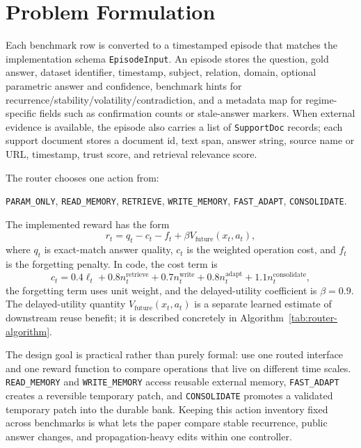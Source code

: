 \section{Problem Formulation}

Each benchmark row is converted to a timestamped episode that matches the implementation schema \texttt{EpisodeInput}. An episode stores the question, gold answer, dataset identifier, timestamp, subject, relation, domain, optional parametric answer and confidence, benchmark hints for recurrence/stability/volatility/contradiction, and a metadata map for regime-specific fields such as confirmation counts or stale-answer markers. When external evidence is available, the episode also carries a list of \texttt{SupportDoc} records; each support document stores a document id, text span, answer string, source name or URL, timestamp, trust score, and retrieval relevance score.

The router chooses one action from:
\begin{center}
\texttt{PARAM\_ONLY}, \texttt{READ\_MEMORY}, \texttt{RETRIEVE}, \texttt{WRITE\_MEMORY}, \texttt{FAST\_ADAPT}, \texttt{CONSOLIDATE}.
\end{center}

The implemented reward has the form
\[
r_t = q_t - c_t - f_t + \beta V_{\text{future}}(x_t, a_t),
\]
where $q_t$ is exact-match answer quality, $c_t$ is the weighted operation cost, and $f_t$ is the forgetting penalty. In code, the cost term is
\[
c_t = 0.4 \ell_t + 0.8 n^{\text{retrieve}}_t + 0.7 n^{\text{write}}_t + 0.8 n^{\text{adapt}}_t + 1.1 n^{\text{consolidate}}_t,
\]
the forgetting term uses unit weight, and the delayed-utility coefficient is $\beta = 0.9$. The delayed-utility quantity $V_{\text{future}}(x_t, a_t)$ is a separate learned estimate of downstream reuse benefit; it is described concretely in Algorithm~\ref{tab:router-algorithm}.

The design goal is practical rather than purely formal: use one routed interface and one reward function to compare operations that live on different time scales. \texttt{READ\_MEMORY} and \texttt{WRITE\_MEMORY} access reusable external memory, \texttt{FAST\_ADAPT} creates a reversible temporary patch, and \texttt{CONSOLIDATE} promotes a validated temporary patch into the durable bank. Keeping this action inventory fixed across benchmarks is what lets the paper compare stable recurrence, public answer changes, and propagation-heavy edits within one controller.
